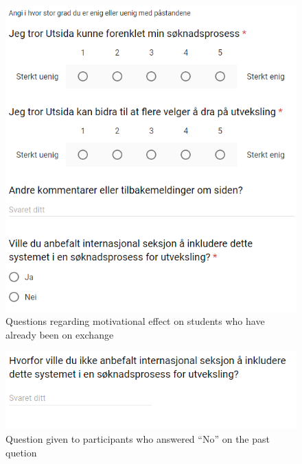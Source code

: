 \begin{figure}[h]
    \centering
    \includegraphics[width=1\textwidth]{fig/form2/s4.PNG}
    \caption[]{Questions regarding motivational effect on students who have already been on exchange}
    \label{fig:questionnaire_2_questions_p4}
\end{figure}
\begin{figure}[h]
    \centering
    \includegraphics[width=1\textwidth]{fig/form2/s5.PNG}
    \caption[]{Question given to participants who answered \enquote{No} on the past quetion}
    \label{fig:questionnaire_2_questions_p5}
\end{figure}
